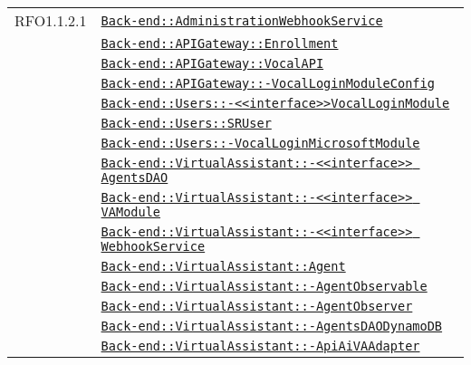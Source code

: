 \begin{longtable}{|>{\centering}m{3cm}|m{10cm}<{\centering}|}
RFO1.1.2.1 & \hyperref[Back-end::AdministrationWebhookService]{\texttt{Back-end::AdministrationWebhookService}}\\
& \hyperref[Back-end::APIGateway::Enrollment]{\texttt{Back-end::APIGateway::Enrollment}}\\
& \hyperref[Back-end::APIGateway::VocalAPI]{\texttt{Back-end::APIGateway::VocalAPI}}\\
& \hyperref[Back-end::APIGateway::VocalLoginModuleConfig]{\texttt{Back-end::APIGateway::-\linebreak VocalLoginModuleConfig}}\\
& \hyperref[Back-end::Users::<<interface>>VocalLoginModule]{\texttt{Back-end::Users::-\linebreak <<interface>>VocalLoginModule}}\\
& \hyperref[Back-end::Users::SRUser]{\texttt{Back-end::Users::SRUser}}\\
& \hyperref[Back-end::Users::VocalLoginMicrosoftModule]{\texttt{Back-end::Users::-\linebreak VocalLoginMicrosoftModule}}\\
& \hyperref[Back-end::VirtualAssistant::<<interface>> AgentsDAO]{\texttt{Back-end::VirtualAssistant::-\linebreak <<interface>> AgentsDAO}}\\
& \hyperref[Back-end::VirtualAssistant::<<interface>> VAModule]{\texttt{Back-end::VirtualAssistant::-\linebreak <<interface>> VAModule}}\\
& \hyperref[Back-end::VirtualAssistant::<<interface>> WebhookService]{\texttt{Back-end::VirtualAssistant::-\linebreak <<interface>> WebhookService}}\\
& \hyperref[Back-end::VirtualAssistant::Agent]{\texttt{Back-end::VirtualAssistant::Agent}}\\
& \hyperref[Back-end::VirtualAssistant::AgentObservable]{\texttt{Back-end::VirtualAssistant::-\linebreak AgentObservable}}\\
& \hyperref[Back-end::VirtualAssistant::AgentObserver]{\texttt{Back-end::VirtualAssistant::-\linebreak AgentObserver}}\\
& \hyperref[Back-end::VirtualAssistant::AgentsDAODynamoDB]{\texttt{Back-end::VirtualAssistant::-\linebreak AgentsDAODynamoDB}}\\
& \hyperref[Back-end::VirtualAssistant::ApiAiVAAdapter]{\texttt{Back-end::VirtualAssistant::-\linebreak ApiAiVAAdapter}}\\

\end{longtable}
